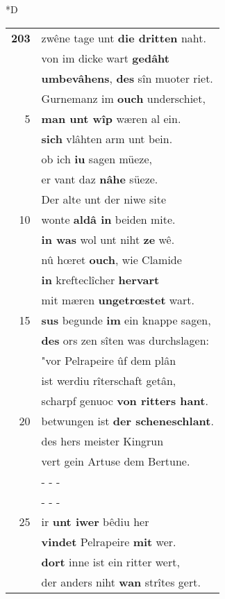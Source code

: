\documentclass[8pt,a4paper,notitlepage]{article}
\begin{document}
\begin{table}[ht]
\begin{minipage}[t]{0.5\linewidth}
\small
\begin{center}*D
\end{center}
\begin{tabular}{rl}
\textbf{203} & zwêne tage unt \textbf{die dritten} naht.\\ 
 & von im dicke wart \textbf{gedâht}\\ 
 & \textbf{umbevâhens}, \textbf{des} sîn muoter riet.\\ 
 & Gurnemanz im \textbf{ouch} underschiet,\\ 
5 & \textbf{man unt wîp} wæren al ein.\\ 
 & \textbf{sich} vlâhten arm unt bein.\\ 
 & ob ich \textbf{iu} sagen müeze,\\ 
 & er vant daz \textbf{nâhe} süeze.\\ 
 & Der alte unt der niwe site\\ 
10 & wonte \textbf{aldâ in} beiden mite.\\ 
 & \textbf{in was} wol unt niht \textbf{ze} wê.\\ 
 & nû hœret \textbf{ouch}, wie Clamide\\ 
 & \textbf{in} krefteclîcher \textbf{hervart}\\ 
 & mit mæren \textbf{ungetrœstet} wart.\\ 
15 & \textbf{sus} begunde \textbf{im} ein knappe sagen,\\ 
 & \textbf{des} ors zen sîten was durchslagen:\\ 
 & "vor Pelrapeire ûf dem plân\\ 
 & ist werdiu rîterschaft getân,\\ 
 & scharpf genuoc \textbf{von ritters hant}.\\ 
20 & betwungen ist \textbf{der scheneschlant}.\\ 
 & des hers meister Kingrun\\ 
 & vert gein Artuse dem Bertune.\\ 
 & \multicolumn{1}{l}{ - - - }\\ 
 & \multicolumn{1}{l}{ - - - }\\ 
25 & ir \textbf{unt iwer} bêdiu her\\ 
 & \textbf{vindet} Pelrapeire \textbf{mit} wer.\\ 
 & \textbf{dort} inne ist ein ritter wert,\\ 
 & der anders niht \textbf{wan} strîtes gert.\\ 

\end{tabular}
\end{minipage}
\end{table}
\end{document}
